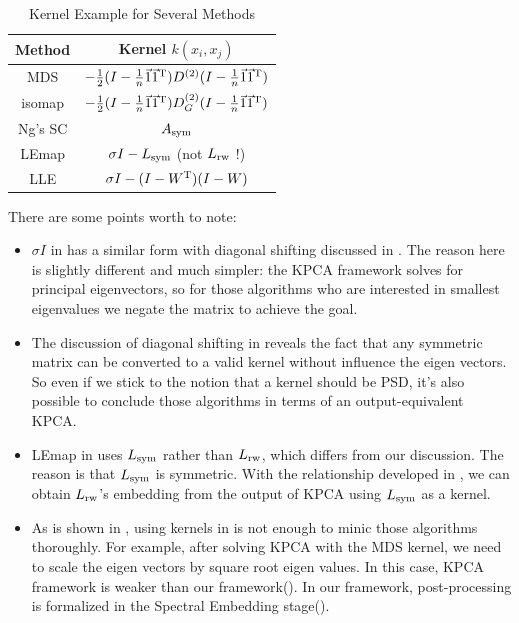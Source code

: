 \begin{table}[htb]
	\centering
	\caption{Kernel Example for Several Methods}
	\label{tbl:kernel}
	\begin{tabular}{c|c}
		\hline 
		Method & Kernel $ k(x_i,x_j) $ \\
		\hline 
		MDS\cite{borg2005modern} 
		& $ -\frac{1}{2}(I - \frac{1}{n} \vec{1} \vec{1}^\mathrm{T})
		D^{(2)} (I - \frac{1}{n} \vec{1} \vec{1}^\mathrm{T}) $ \\
		isomap\cite{tenenbaum2000isomap} 
		& $ -\frac{1}{2}(I - \frac{1}{n} \vec{1} \vec{1}^\mathrm{T})
		D_G^{(2)} (I - \frac{1}{n} \vec{1} \vec{1}^\mathrm{T}) $ \\
		Ng's SC\cite{ng2002spectral} & $ A_{\text{sym}} $ \\
		LEmap\cite{belkin2003laplacian} & $ \sigma I - L_{\text{sym}} $ (not $ L_{\text{rw}}$ !)\\ 
		LLE\cite{roweis2000lle} & $ \sigma I - (I - W^\mathrm{T})(I - W) $ \\
		\hline 
	\end{tabular}
\end{table} 

There are some points worth to note:
\begin{itemize}
	\item $ \sigma I $ in \rtbl{\ref{tbl:kernel}} has a similar 
	form with diagonal shifting discussed in \rsec{\ref{sec:diags}}. 
	The reason here is slightly different and much simpler: the KPCA framework
	solves for principal eigenvectors, so for those algorithms 
	who are interested in smallest eigenvalues we negate the matrix 
	to achieve the goal. 
	\item The discussion of diagonal shifting in \rsec{\ref{sec:diags}}
	reveals the fact that any symmetric matrix can be converted to a valid
	kernel without influence the eigen vectors. So even if we stick 
	to the notion that a kernel should be PSD, it's also possible to 
	conclude those algorithms in terms of an output-equivalent KPCA. 
	\item LEmap in \rtbl{\ref{tbl:kernel}} uses $ L_{\text{sym}} $ rather than 
	$ L_{\text{rw}} $, which differs from our discussion. The reason is 
	that $ L_{\text{sym}} $ is symmetric. With the relationship developed in 
	\rsec{\ref{sec:adj_lap}}, we can obtain $ L_{\text{rw}} $'s embedding 
	from the output of KPCA using $ L_{\text{sym}} $ as a kernel. 
	\item As is shown in \cite{bengio2006spectral}, 
	using kernels in \rtbl{\ref{tbl:kernel}} is not enough to 
	minic those algorithms thoroughly. For example, after 
	solving KPCA with the MDS kernel, we need to scale the eigen 
	vectors by square root eigen values. In this case, KPCA framework 
	is weaker than our framework(\rsec{\ref{sec:framework}}). 
	In our framework, post-processing is formalized in the 
	Spectral Embedding stage(\rsec{\ref{sec:se}}). 
\end{itemize}



